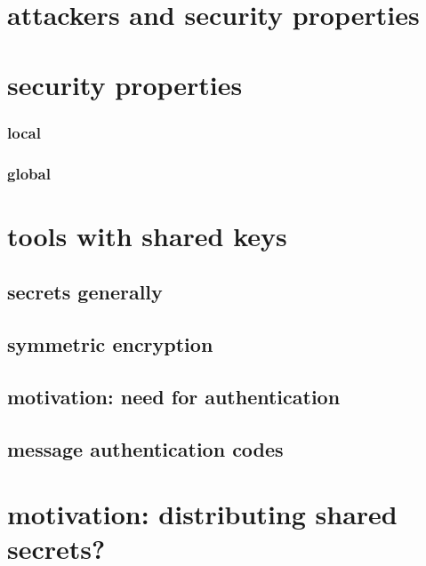
\section{attackers and security properties}


\section{security properties}


\subsubsection{local}

\subsubsection{global}

\section{tools with shared keys}

\subsection{secrets generally}


\subsection{symmetric encryption}


\subsection{motivation: need for authentication}


\subsection{message authentication codes}


\section{motivation: distributing shared secrets?}


